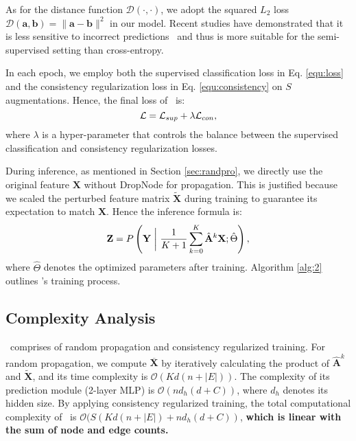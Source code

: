 {As for the distance function $\mathcal{D}(\cdot, \cdot)$, we adopt the squared $L_2$ loss $\mathcal{D}(\mathbf{a}, \mathbf{b})=\|\mathbf{a}-\mathbf{b}\|^2$ in our model. 
Recent studies have demonstrated that it is less sensitive to incorrect predictions~\cite{berthelot2019mixmatch} and thus is more suitable for the semi-supervised setting than cross-entropy. 



In each epoch, we employ both the supervised classification loss in Eq. \ref{equ:loss} and the consistency regularization loss in Eq. \ref{equ:consistency} on $S$ augmentations. 
Hence, the final loss of \model\ is:
\begin{equation}
\small
\label{equ:inf}
	\mathcal{L} = \mathcal{L}_{sup} + \lambda \mathcal{L}_{con},
\end{equation}
where $\lambda$ is a hyper-parameter that controls the balance between the supervised classification and consistency regularization losses.


During inference, as mentioned in Section \ref{sec:randpro}, we directly use the original feature $\mathbf{X}$ without DropNode for propagation. 
This is justified because we scaled  the perturbed feature matrix $\widetilde{\mathbf{X}}$ during training to guarantee its expectation to match $\mathbf{X}$. 
Hence the inference formula is:
\begin{equation}
\small
\label{equ:inference}
\mathbf{Z}= P\left(\mathbf{Y}~\bigg|~\frac{1}{K+1}\sum_{k=0}^K\hat{\mathbf{A}}^k \mathbf{X};\hat{\Theta}\right),
\end{equation}
where $\hat{\Theta}$ denotes the optimized parameters after training. 
Algorithm \ref{alg:2} outlines \model's training process.  


\subsection{Complexity Analysis} 
\model\ comprises of random propagation and consistency regularized training. 
For random propagation, we compute $\overline{\mathbf{X}}$ by iteratively calculating the product of $\hat{\mathbf{A}}^k$ and $\widetilde{\mathbf{X}}$, and its time complexity is $\mathcal{O}(Kd(n+|E|))$. 
The complexity of its prediction module (2-layer MLP) is $\mathcal{O}(nd_h(d+ C))$, where $d_h$ denotes its hidden size. 
By applying consistency regularized training, the total computational complexity of \model\ is $\mathcal{O}(S(Kd(n + |E|)+ nd_h(d + C))$, \textbf{which is linear with the sum of node and edge counts.
}


}
